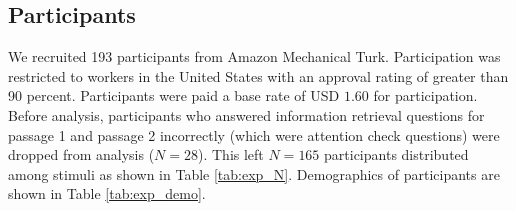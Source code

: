 \subsection{Participants} 

We recruited 193 participants from Amazon Mechanical Turk. Participation was restricted to
workers in the United States with an approval rating of greater than 90 percent. Participants were paid a base rate of USD $1.60$ for participation. Before analysis, participants who answered information retrieval questions for passage 1 and passage 2 incorrectly (which were attention check questions) were dropped from analysis ($N = 28$).  This left $N = 165$ participants distributed among stimuli as shown in Table \ref{tab:exp_N}. Demographics of participants are shown in Table \ref{tab:exp_demo}.


\begin{table}[h!]
\caption{Participant demographics.}
\label{tab:exp_demo}
\end{table}

